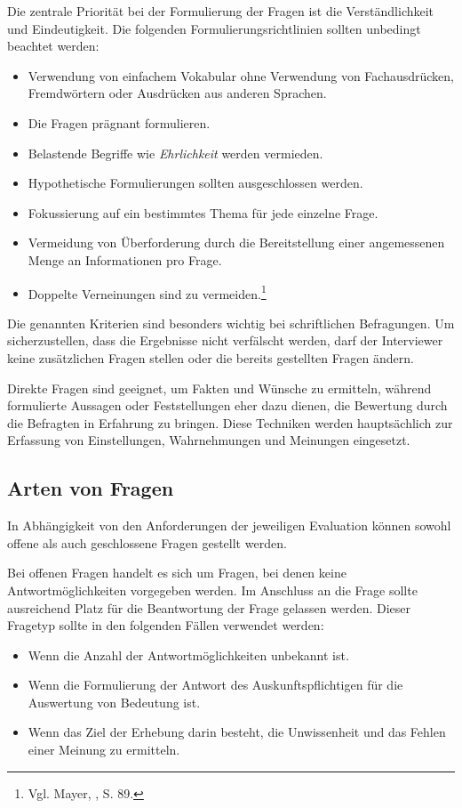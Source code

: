 Die zentrale Priorität bei der Formulierung der Fragen ist die Verständlichkeit und Eindeutigkeit. Die folgenden
Formulierungsrichtlinien sollten unbedingt beachtet werden:
\begin{itemize}
    \item Verwendung von einfachem Vokabular ohne Verwendung von Fachausdrücken, Fremdwörtern oder Ausdrücken aus anderen Sprachen.
    \item Die Fragen prägnant formulieren.
    \item Belastende Begriffe wie \textit{Ehrlichkeit} werden vermieden.
    \item Hypothetische Formulierungen sollten ausgeschlossen werden.
    \item Fokussierung auf ein bestimmtes Thema für jede einzelne Frage.
    \item Vermeidung von Überforderung durch die Bereitstellung einer angemessenen Menge an Informationen pro Frage.
    \item Doppelte Verneinungen sind zu vermeiden.\footnote{Vgl. Mayer, \cite{Interview und schriftliche Befragung}, S. 89.}\\
\end{itemize}

Die genannten Kriterien sind besonders wichtig bei schriftlichen Befragungen. Um sicherzustellen, dass die Ergebnisse nicht
verfälscht werden, darf der Interviewer keine zusätzlichen Fragen stellen oder die bereits gestellten Fragen ändern.

Direkte Fragen sind geeignet, um Fakten und Wünsche zu ermitteln, während formulierte Aussagen oder Feststellungen eher
dazu dienen, die Bewertung durch die Befragten in Erfahrung zu bringen. Diese Techniken werden hauptsächlich zur Erfassung
von Einstellungen, Wahrnehmungen und Meinungen eingesetzt.

\subsection{Arten von Fragen}
In Abhängigkeit von den Anforderungen der jeweiligen Evaluation können sowohl offene als auch geschlossene Fragen gestellt werden.

Bei offenen Fragen handelt es sich um Fragen, bei denen keine Antwortmöglichkeiten vorgegeben werden. Im Anschluss an die
Frage sollte ausreichend Platz für die Beantwortung der Frage gelassen werden. Dieser Fragetyp sollte in den folgenden
Fällen verwendet werden:
\begin{itemize}
    \item Wenn die Anzahl der Antwortmöglichkeiten unbekannt ist.
    \item Wenn die Formulierung der Antwort des Auskunftspflichtigen für die Auswertung von Bedeutung ist.
    \item Wenn das Ziel der Erhebung darin besteht, die Unwissenheit und das Fehlen einer Meinung zu ermitteln.\\
\end{itemize}

